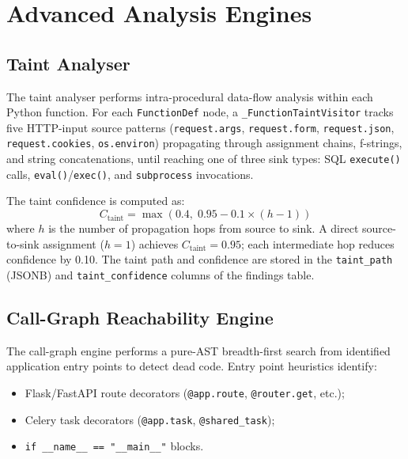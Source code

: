 \section{Advanced Analysis Engines}
\label{sec:advanced_engines}

\subsection{Taint Analyser}
\label{subsec:taint}

The taint analyser performs intra-procedural data-flow analysis within each Python function.
For each \texttt{FunctionDef} node, a \texttt{\_FunctionTaintVisitor} tracks five HTTP-input
source patterns (\texttt{request.args}, \texttt{request.form}, \texttt{request.json},
\texttt{request.\allowbreak cookies}, \texttt{os.environ}) propagating through assignment chains,
f-strings, and string concatenations, until reaching one of three sink types:
SQL \texttt{execute()} calls, \texttt{eval()}/\texttt{exec()}, and \texttt{subprocess} invocations.

The taint confidence is computed as:
\begin{equation}
  C_{\text{taint}} = \max(0.4, \; 0.95 - 0.1 \times (h - 1))
  \label{eq:taint_conf}
\end{equation}
where $h$ is the number of propagation hops from source to sink. A direct source-to-sink assignment ($h=1$) achieves $C_{\text{taint}} = 0.95$; each intermediate hop reduces confidence by 0.10. The taint path and confidence are stored in the \texttt{taint\_path} (JSONB) and \texttt{taint\_confidence} columns of the findings table.

\subsection{Call-Graph Reachability Engine}
\label{subsec:callgraph}

The call-graph engine performs a pure-AST breadth-first search from identified application entry points to detect dead code. Entry point heuristics identify:
\begin{itemize}
  \item Flask/FastAPI route decorators (\texttt{@app.route}, \texttt{@router.get}, etc.);
  \item Celery task decorators (\texttt{@app.task}, \texttt{@shared\_task});
  \item \texttt{if \_\_name\_\_ == "\_\_main\_\_"} blocks.
\end{itemize}

